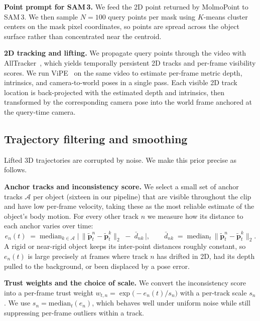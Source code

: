 \documentclass{llmxive}
\begin{document}
\noindent\textbf{Point prompt for SAM\,3.}
We feed the 2D point returned by MolmoPoint to SAM\,3. We then sample $N=100$ query points per mask using $K$-means cluster centers on the mask pixel coordinates, so points are spread across the object surface rather than concentrated near the centroid.

\noindent\textbf{2D tracking and lifting.}
We propagate query points through the video with AllTracker~\cite{alltracker}, which yields temporally persistent 2D tracks and per-frame visibility scores. We run ViPE~\cite{vipe} on the same video to estimate per-frame metric depth, intrinsics, and camera-to-world poses in a single pass. Each visible 2D track location is back-projected with the estimated depth and intrinsics, then transformed by the corresponding camera pose into the world frame anchored at the query-time camera.

\subsection{Trajectory filtering and smoothing}
\label{appsec:filtering}

Lifted 3D trajectories are corrupted by noise. We make this prior precise as follows.

\noindent\textbf{Anchor tracks and inconsistency score.}
We select a small set of anchor tracks $\mathcal{A}$ per object (sixteen in our pipeline) that are visible throughout the clip and have low per-frame velocity, taking these as the most reliable estimate of the object's body motion. For every other track $n$ we measure how its distance to each anchor varies over time:
\begin{equation}
e_n(t) \;=\; \mathrm{median}_{k \in \mathcal{A}}\;\bigl|\, \|\tilde{\mathbf{p}}_t^{n} - \tilde{\mathbf{p}}_t^{k}\|_2 \;-\; \bar d_{nk} \,\bigr|,
\qquad
\bar d_{nk} \;=\; \mathrm{median}_t\, \|\tilde{\mathbf{p}}_t^{n} - \tilde{\mathbf{p}}_t^{k}\|_2 .
\end{equation}
A rigid or near-rigid object keeps its inter-point distances roughly constant, so $e_n(t)$ is large precisely at frames where track $n$ has drifted in 2D, had its depth pulled to the background, or been displaced by a pose error.

\noindent\textbf{Trust weights and the choice of scale.}
We convert the inconsistency score into a per-frame trust weight $w_{t,n} = \exp\bigl(-e_n(t)/s_n\bigr)$ with a per-track scale $s_n$. We use $s_n = \mathrm{median}_t(e_n)$, which behaves well under uniform noise while still suppressing per-frame outliers within a track.
\end{document}
